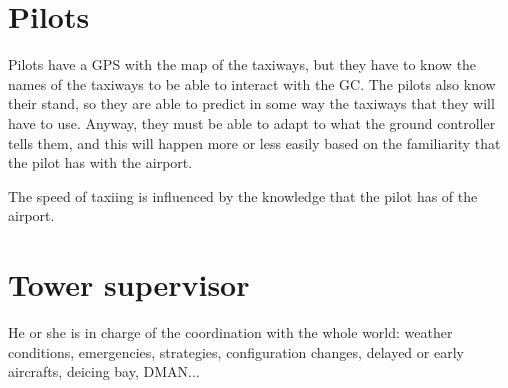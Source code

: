\documentclass{article}
\begin{document}
\section{Pilots}
Pilots have a GPS with the map of the taxiways, but they have to know the names of the taxiways to be able to interact with the GC. The pilots also know their stand, so they are able to predict in some way the taxiways that they will have to use. Anyway, they must be able to adapt to what the ground controller tells them, and this will happen more or less easily based on the familiarity that the pilot has with the airport.

The speed of taxiing is influenced by the knowledge that the pilot has of the airport.

\section{Tower supervisor}
He or she is in charge of the coordination with the whole world: weather conditions, emergencies, strategies, configuration changes, delayed or early aircrafts, deicing bay, DMAN...
\end{document}
